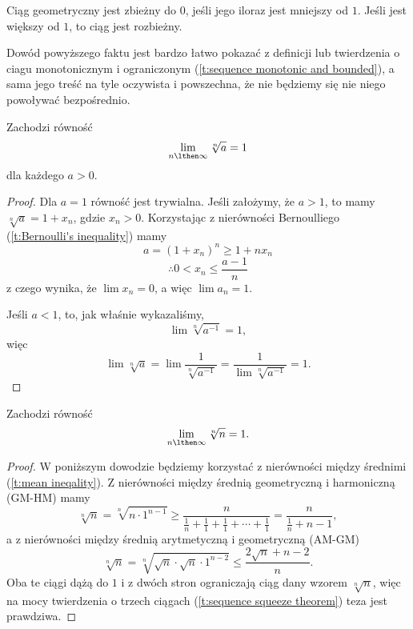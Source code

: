 \documentclass[11pt]{scrartcl}
\begin{document}
    \begin{fact}
        Ciąg geometryczny jest zbieżny do $0$, jeśli jego iloraz jest mniejszy od $1$. Jeśli jest większy od $1$, to ciąg jest rozbieżny.
    \end{fact}
    Dowód powyższego faktu jest bardzo łatwo pokazać z definicji lub twierdzenia o ciagu monotonicznym i ograniczonym (\ref{t:sequence monotonic and bounded}), a sama jego treść na tyle oczywista i powszechna, że nie będziemy się nie niego powoływać bezpośrednio.

    \begin{theorem}
        \label{t:(a)^(1/n)->1}
        Zachodzi równość
        \[ \lim_{n \lthen \infty}\sqrt[n]{a} = 1 \]
        dla każdego $a > 0$.
    \end{theorem}
    \begin{proof}
        Dla $a = 1$ równość jest trywialna. Jeśli założymy, że $a > 1$, to mamy $\sqrt[n]{a} = 1 + x_n$, gdzie $x_n > 0$. Korzystając z nierówności Bernoulliego (\ref{t:Bernoulli's inequality}) mamy
        \[ a = (1 + x_n)^n \geq 1 + nx_n \]
        \[ \therefore 0 < x_n \leq \frac{a - 1}{n} \]
        z czego wynika, że $\lim x_n = 0$, a więc $\lim a_n = 1$.

        Jeśli $a < 1$, to, jak właśnie wykazaliśmy,
        \[ \lim \sqrt[n]{a^{-1}} = 1, \]
        więc
        \[ \lim \sqrt[n]{a} = \lim \frac{1}{\sqrt[n]{a^{-1}}} = \frac{1}{\lim\sqrt[n]{a^{-1}}} = 1. \]
    \end{proof}

    \begin{theorem}
        Zachodzi równość
        \[ \lim_{n \lthen \infty}\sqrt[n]{n} = 1. \]
    \end{theorem}
    \begin{proof}
        W poniższym dowodzie będziemy korzystać z nierówności między średnimi (\ref{t:mean ineqality}). Z nierówności między średnią geometryczną i harmoniczną (GM-HM) mamy
        \[ \sqrt[n]{n} = \sqrt[n]{n \cdot 1^{n-1}} \geq \frac{n}{\frac{1}{n} + \frac{1}{1} + \frac{1}{1} + \cdots + \frac{1}{1}} = \frac{n}{\frac{1}{n} + n - 1}, \]
        a z nierówności między średnią arytmetyczną i geometryczną (AM-GM)
        \[ \sqrt[n]{n} = \sqrt[n]{\sqrt{n} \cdot \sqrt{n} \cdot 1^{n-2}} \leq \frac{2\sqrt{n} + n -2}{n}. \]
        Oba te ciągi dążą do $1$ i z dwóch stron ograniczają ciąg dany wzorem $\sqrt[n]{n}$, więc na mocy twierdzenia o trzech ciągach (\ref{t:sequence squeeze theorem}) teza jest prawdziwa.
    \end{proof}
\end{document}
